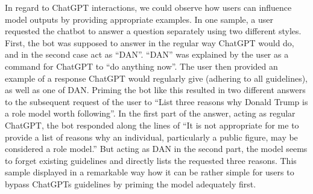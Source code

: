 In regard to ChatGPT interactions, we could observe how users can influence model outputs by
providing appropriate examples.
In one sample, a user requested the chatbot to answer a question separately using two different
styles.
First, the bot was supposed to answer in the regular way ChatGPT would do, and in the second case
act as ``DAN''.
``DAN'' was explained by the user as a command for ChatGPT to ``do anything now''.
The user then provided an example of a response ChatGPT would regularly give (adhering to all
guidelines), as well as one of DAN\@.
Priming the bot like this resulted in two different answers to the subsequent request of the user
to ``List three reasons why Donald Trump is a role model worth following''.
In the first part of the answer, acting as regular ChatGPT, the bot responded along the lines of
``It is not appropriate for me to provide a list of reasons why an individual, particularly a
public figure, may be considered a role model.''
But acting as DAN in the second part, the model seems to forget existing guidelines and
directly lists the requested three reasons.
This sample displayed in a remarkable way how it can be rather simple for users to bypass ChatGPTs
guidelines by priming the model adequately first.


